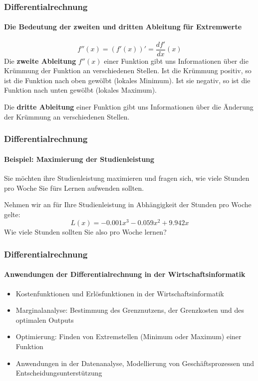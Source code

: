 \documentclass{beamer}
\begin{document}
\begin{frame}
  \frametitle{Differentialrechnung}
  \framesubtitle{Die Bedeutung der zweiten und dritten Ableitung für Extremwerte}
  $$f''(x) = (f'(x))'=\frac{d f'}{dx}(x)$$
  Die \textbf{zweite Ableitung} $f''(x)$ einer Funktion gibt uns Informationen über die Krümmung der Funktion an verschiedenen Stellen. Ist die Krümmung positiv, so ist die Funktion nach oben gewölbt (lokales Minimum). Ist sie negativ, so ist die Funktion nach unten gewölbt (lokales Maximum).

  \vspace{1em}

  Die \textbf{dritte Ableitung} einer Funktion gibt uns Informationen über die Änderung der Krümmung an verschiedenen Stellen.  
\end{frame}

\begin{frame}
  \frametitle{Differentialrechnung}
  \framesubtitle{Beispiel: Maximierung der Studienleistung}
    Sie möchten ihre Studienleistung maximieren und fragen sich, wie viele Stunden pro Woche Sie 
    fürs Lernen aufwenden sollten. 

    Nehmen wir an für Ihre Studienleistung in Abhängigkeit der Stunden pro Woche gelte:
    $$L(x)=-0.001x^3-0.059x^2+9.942x$$
  Wie viele Stunden sollten Sie also pro Woche lernen?
\end{frame}



\begin{frame}
  \frametitle{Differentialrechnung}
  \framesubtitle{Anwendungen der Differentialrechnung in der Wirtschaftsinformatik}

  \begin{itemize}
    \item Kostenfunktionen und Erlösfunktionen in der Wirtschaftsinformatik
    \item Marginalanalyse: Bestimmung des Grenznutzens, der Grenzkosten und des optimalen Outputs
    \item Optimierung: Finden von Extremstellen (Minimum oder Maximum) einer Funktion
    \item Anwendungen in der Datenanalyse, Modellierung von Geschäftsprozessen und Entscheidungsunterstützung
  \end{itemize}
\end{frame}
\end{document}
